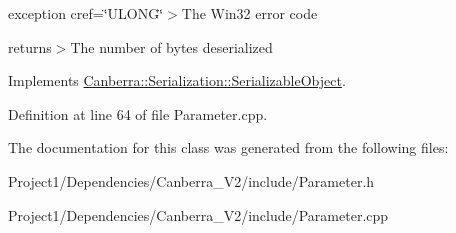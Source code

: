 exception cref=\char`\"{}\+U\+L\+O\+N\+G\char`\"{}$>$The Win32 error code

returns$>$The number of bytes deserialized

Implements \hyperlink{class_canberra_1_1_serialization_1_1_serializable_object}{Canberra\+::\+Serialization\+::\+Serializable\+Object}.



Definition at line 64 of file Parameter.\+cpp.



The documentation for this class was generated from the following files\+:\begin{DoxyCompactItemize}
\item 
Project1/\+Dependencies/\+Canberra\+\_\+\+V2/include/Parameter.\+h\item 
Project1/\+Dependencies/\+Canberra\+\_\+\+V2/include/Parameter.\+cpp\end{DoxyCompactItemize}

